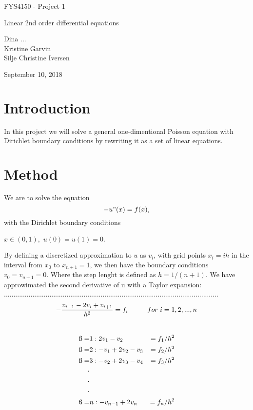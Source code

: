 \documentclass[norsk]{article}
\begin{document}
	\vspace*{1cm}
	\begin{center}
	{\huge FYS4150 - Project 1 \par}
	{\huge Linear 2nd order differential equations\par}
	\vspace{0.5cm}
	{\Large Dina ... \\ Kristine Garvin \\ Silje Christine Iversen \par}	
	\vspace{0.5cm}
	{\Large September 10, 2018 \par}
	\vspace{1cm}
	\end{center}
	
\section{Introduction}
In this project we will solve a general one-dimentional Poisson equation with Dirichlet boundary conditions by rewriting it as a set of linear equations. 

\section{Method}
We are to solve the equation $$-u"(x) = f(x),$$
with the Dirichlet boundary conditions \\ 
\begin{center}
$x\in (0,1), $ \hspace*{1cm} $u(0) = u(1) = 0.$
\end{center}
By defining a discretized approximation to $u$ as $v_i$, with grid points $x_i = ih$ in the interval from $x_0$ to $x_{n+1}=1$, we then have the boundary conditions $v_0=v_{n+1}=0$. Where the step lenght is defined as $h = 1/(n+1)$. We have approwimated the second derivative of u with a Taylor expansion: .................................................................................................................
$$\displaystyle-\frac{v_{i-1} - 2v_i + v_{i+1}}{h^2}=f_i\hspace*{1cm} 
for \hspace{3pt} i=1, 2,...,n$$
\\
\begin{align*}
\i=&1:   2v_1 - v_2 &= f_1/h^2 \\
\i=&2:  -v_1 + 2v_2 - v_3 &= f_2/h^2 \\ 
\i=&3:  -v_2 + 2v_3 - v_4 &= f_3/h^2 \\
\cdot \\
\cdot \\
\cdot \\
\i=&n:  -v_{n-1} + 2v_n &= f_n/h^2 \\ 
\end{align*}
\end{document}
